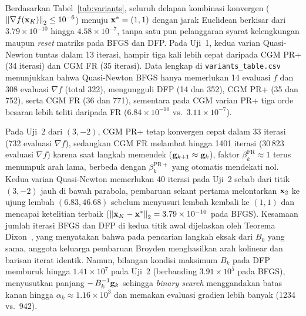 \documentclass[12pt,a4paper]{article}
\begin{document}
Berdasarkan Tabel~\ref{tab:variants}, seluruh delapan kombinasi konvergen ($\left\lVert \nabla f(\mathbf{x}_K)\right\rVert_2\le10^{-6}$) menuju
$\mathbf{x}^*=(1,1)$ dengan jarak Euclidean berkisar dari $3.79\times10^{-10}$ hingga $4.58\times10^{-7}$, tanpa satu pun
pelanggaran syarat kelengkungan maupun \emph{reset} matriks pada BFGS dan DFP. Pada Uji~1, kedua varian Quasi-Newton
tuntas dalam 13 iterasi, hampir tiga kali lebih cepat daripada CGM PR+ (34 iterasi) dan CGM FR (35 iterasi). Data
lengkap di \texttt{variants\_table.csv} menunjukkan bahwa Quasi-Newton BFGS hanya memerlukan 14 evaluasi $f$ dan 308
evaluasi $\nabla f$ (total 322), mengungguli DFP (14 dan 352), CGM PR+ (35 dan 752), serta CGM FR (36 dan 771),
sementara pada CGM varian PR+ tiga orde besaran lebih teliti daripada FR ($6.84\times10^{-10}$ vs.\
$3.11\times10^{-7}$).

Pada Uji~2 dari $(3,-2)$, CGM PR+ tetap konvergen cepat dalam 33 iterasi (732 evaluasi $\nabla f$), sedangkan CGM FR
melambat hingga 1401 iterasi ($30\,823$ evaluasi $\nabla f$) karena saat langkah memendek ($\mathbf{g}_{k+1}\approx\mathbf{g}_k$),
faktor $\beta_k^{\mathrm{FR}}\approx1$ terus menumpuk arah lama, berbeda dengan $\beta_k^{\mathrm{PR+}}$ yang otomatis
mendekati nol. Kedua varian Quasi-Newton memerlukan 40 iterasi pada Uji~2 sebab dari titik $(3,-2)$ jauh di bawah
parabola, pembaruan sekant pertama melontarkan $\mathbf{x}_2$ ke ujung lembah $(6.83,46.68)$ sebelum menyusuri lembah kembali
ke $(1,1)$ dan mencapai ketelitian terbaik ($\left\lVert \mathbf{x}_K-\mathbf{x}^*\right\rVert_2=3.79\times10^{-10}$ pada BFGS). Kesamaan jumlah iterasi
BFGS dan DFP di kedua titik awal dijelaskan oleh Teorema Dixon~\cite{dixon}, yang menyatakan bahwa pada pencarian
langkah eksak dari $B_0$ yang sama, anggota keluarga pembaruan Broyden menghasilkan arah kolinear dan barisan iterat
identik. Namun, bilangan kondisi maksimum $B_k$ pada DFP memburuk hingga $1.41\times10^7$ pada Uji~2 (berbanding
$3.91\times10^5$ pada BFGS), menyusutkan panjang $-\,B_k^{-1}\mathbf{g}_k$ sehingga \emph{binary search} menggandakan batas
kanan hingga $\alpha_k\approx1.16\times10^3$ dan memakan evaluasi gradien lebih banyak (1234 vs.\ 942).
\end{document}
